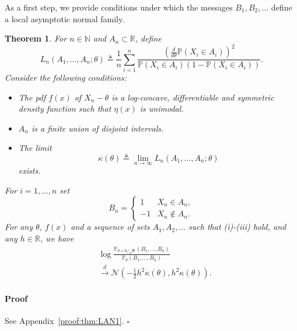 \documentclass[letterpaper, 11pt]{IEEEtran}      %
\newtheorem{thm}{\bf{Theorem}}
\newenvironment{proof}{\paragraph*{Proof}}{\hfill$\square$ \newline}
\newcommand{\Prob}{\mathbb{P} }
\newcommand{\Ncal}{\mathcal{N}}
\begin{document}
As a first step, we provide conditions under which the messages $B_1,B_2,\ldots$ define a local asymptotic normal family. 

\begin{thm} \label{thm:LAN1}
For $n \in \mathbb N$ and $A_n \subset \mathbb R$,  define
\begin{equation}
\label{eq:precision_general}
L_n(A_1,\ldots,A_n;\theta) \triangleq \frac{1}{n} \sum_{i=1}^n \frac{ \left(\frac{d}{d \theta} \Prob(X_i \in A_i) \right)^2 }{ \Prob(X_i \in A_i)\left(1- \Prob(X_i \in A_i) \right) }. 
\end{equation}
Consider the following conditions:
\begin{itemize}
\item [(i)\,\,] The pdf $f(x)$ of $X_n-\theta$ is a log-concave, differentiable and symmetric density function such that $\eta(x)$ is unimodal.
\item[(ii)\,] $A_n$ is a finite union of disjoint intervals.
\item[(iii)] The limit 
\begin{equation}
\label{eq:LAN_lim}
\kappa(\theta) \triangleq \lim_{n\to \infty} L_n(A_1,\ldots,A_n; \theta)
\end{equation}
exists. 
\end{itemize}
For $i=1,\ldots,n$ set
\[
B_n = \begin{cases} 1 & X_n \in A_n, \\
-1 & X_n \notin A_n. 
\end{cases} 
\]
For any $\theta$, $f(x)$ and a sequence of sets $A_1,A_2,\ldots$ such that (i)-(iii) hold, and any $h\in \mathbb R$, we have
\begin{align*}
& \log  \frac{ \mathbb P_{\theta+h/\sqrt{n}} (B_1,\ldots,B_n) }{
\mathbb P_{\theta} (B_1,\ldots,B_n)} \\
& \overset{d}{\longrightarrow} \Ncal\left(-\frac{1}{2} h^2 \kappa(\theta), h^2 \kappa(\theta) \right).
\end{align*} 
\end{thm}

\begin{proof}
See Appendix~\ref{proof:thm:LAN1}. 
\end{proof}
\end{document}
